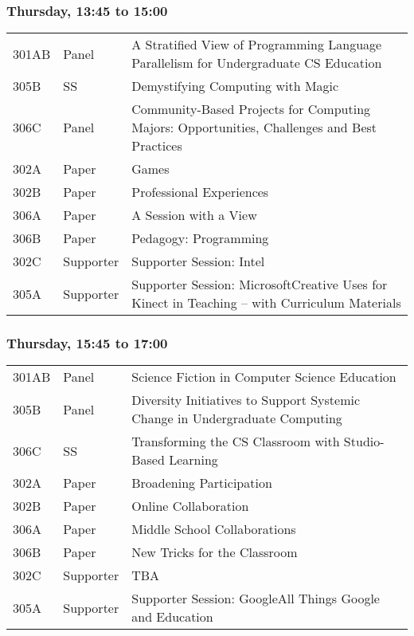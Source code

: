 \subsubsection*{Thursday, 13:45 to 15:00}
\begin{tabular*}{5in}{@{}p{0.5in}@{}p{0.75in}@{}p{3.75in}}

301AB & Panel & A Stratified View of Programming Language Parallelism for Undergraduate CS Education \\

305B & SS & Demystifying Computing with Magic \\

306C & Panel & Community-Based Projects for Computing Majors:  Opportunities, Challenges and Best Practices \\

302A & Paper & Games \\

302B & Paper & Professional Experiences \\

306A & Paper & A Session with a View \\

306B & Paper & Pedagogy:  Programming \\

302C & Supporter & Supporter Session: Intel \\

305A & Supporter & Supporter Session: MicrosoftCreative Uses for Kinect in Teaching – with Curriculum Materials 
\end{tabular*}

\subsubsection*{Thursday, 15:45 to 17:00}
\begin{tabular*}{5in}{@{}p{0.5in}@{}p{0.75in}@{}p{3.75in}}

301AB & Panel & Science Fiction in Computer Science Education \\

305B & Panel & Diversity Initiatives to Support Systemic Change in Undergraduate Computing \\

306C & SS & Transforming the CS Classroom with Studio-Based Learning \\

302A & Paper & Broadening Participation \\

302B & Paper & Online Collaboration \\

306A & Paper & Middle School Collaborations \\

306B & Paper & New Tricks for the Classroom \\

302C & Supporter & TBA \\

305A & Supporter & Supporter Session: GoogleAll Things Google and Education 
\end{tabular*}
